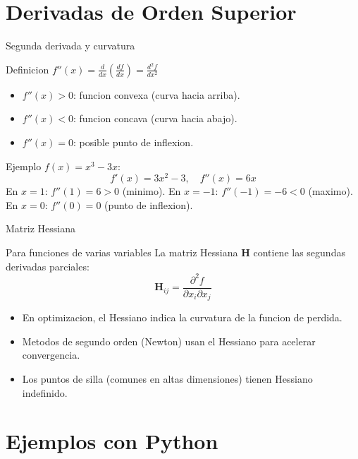 \documentclass[aspectratio=169, 10pt, xcolor=table]{beamer}
\begin{document}
\section{Derivadas de Orden Superior}

\begin{frame}{Segunda derivada y curvatura}
    \begin{block}{Definicion}
        $f''(x) = \frac{d}{dx}\left(\frac{df}{dx}\right) = \frac{d^2f}{dx^2}$
    \end{block}
    \begin{itemize}
        \item $f''(x) > 0$: funcion convexa (curva hacia arriba).
        \item $f''(x) < 0$: funcion concava (curva hacia abajo).
        \item $f''(x) = 0$: posible punto de inflexion.
    \end{itemize}
    \begin{exampleblock}{Ejemplo}
        $f(x)=x^3-3x$:
        \[
        f'(x)=3x^2-3,\quad f''(x)=6x
        \]
        En $x=1$: $f''(1)=6>0$ (minimo). En $x=-1$: $f''(-1)=-6<0$ (maximo). En $x=0$: $f''(0)=0$ (punto de inflexion).
    \end{exampleblock}
\end{frame}

\begin{frame}{Matriz Hessiana}
    \begin{block}{Para funciones de varias variables}
        La matriz Hessiana $\mathbf{H}$ contiene las segundas derivadas parciales:
        \[
        \mathbf{H}_{ij} = \frac{\partial^2 f}{\partial x_i \partial x_j}
        \]
    \end{block}
    \begin{itemize}
        \item En optimizacion, el Hessiano indica la curvatura de la funcion de perdida.
        \item Metodos de segundo orden (Newton) usan el Hessiano para acelerar convergencia.
        \item Los puntos de silla (comunes en altas dimensiones) tienen Hessiano indefinido.
    \end{itemize}
\end{frame}

\section{Ejemplos con Python}
\end{document}
